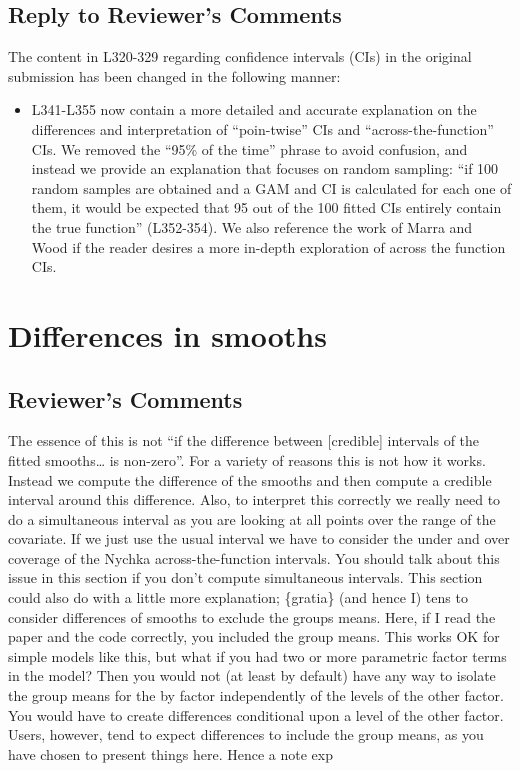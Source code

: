 \documentclass[
]{article}
\providecommand{\tightlist}{%
  \setlength{\itemsep}{0pt}\setlength{\parskip}{0pt}}
\begin{document}
\hypertarget{section-8}{%
\subsection{\texorpdfstring{\textcolor{reviewersblue} {Reply to Reviewer's Comments}}{}}\label{section-8}}

The content in L320-329 regarding confidence intervals (CIs) in the original submission has been changed in the following manner:

\begin{itemize}
\tightlist
\item
  L341-L355 now contain a more detailed and accurate explanation on the differences and interpretation of ``poin-twise'' CIs and ``across-the-function'' CIs. We removed the ``95\% of the time'' phrase to avoid confusion, and instead we provide an explanation that focuses on random sampling: ``if 100 random samples are obtained and a GAM and CI is calculated for each one of them, it would be expected that 95 out of the 100 fitted CIs entirely contain the true function'' (L352-354). We also reference the work of Marra and Wood if the reader desires a more in-depth exploration of across the function CIs.
\end{itemize}

\hypertarget{differences-in-smooths}{%
\section{Differences in smooths}\label{differences-in-smooths}}

\hypertarget{reviewers-comments-8}{%
\subsection{Reviewer's Comments}\label{reviewers-comments-8}}

The essence of this is not ``if the difference between {[}credible{]} intervals of the fitted smooths\ldots{} is non-zero''. For a variety of reasons this is not how it works. Instead we compute the difference of the smooths and then compute a credible interval around this difference. Also, to interpret this correctly we really need to do a simultaneous interval as you are looking at all points over the range of the covariate. If we just use the usual interval we have to consider the under and over coverage of the Nychka across-the-function intervals. You should talk about this issue in this section if you don't compute simultaneous intervals.
This section could also do with a little more explanation; \{gratia\} (and hence I) tens to consider differences of smooths to exclude the groups means. Here, if I read the paper and the code correctly, you included the group means. This works OK for simple models like this, but what if you had two or more parametric factor terms in the model? Then you would not (at least by default) have any way to isolate the group means for the by factor independently of the levels of the other factor. You would have to create differences conditional upon a level of
the other factor. Users, however, tend to expect differences to include the group means, as you have chosen to present things here. Hence a note exp
\end{document}
